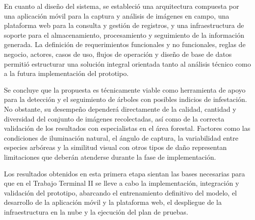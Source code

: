 En cuanto al diseño del sistema, se estableció una arquitectura compuesta por una aplicación móvil para la captura y análisis de imágenes en campo, una plataforma web para la consulta y gestión de registros, y una infraestructura de soporte para el almacenamiento, procesamiento y seguimiento de la información generada. La definición de requerimientos funcionales y no funcionales, reglas de negocio, actores, casos de uso, flujos de operación y diseño de base de datos permitió estructurar una solución integral orientada tanto al análisis técnico como a la futura implementación del prototipo.

Se concluye que la propuesta es técnicamente viable como herramienta de apoyo para la detección y el seguimiento de árboles con posibles indicios de infestación. No obstante, su desempeño dependerá directamente de la calidad, cantidad y diversidad del conjunto de imágenes recolectadas, así como de la correcta validación de los resultados con especialistas en el área forestal. Factores como las condiciones de iluminación natural, el ángulo de captura, la variabilidad entre especies arbóreas y la similitud visual con otros tipos de daño representan limitaciones que deberán atenderse durante la fase de implementación.

Los resultados obtenidos en esta primera etapa sientan las bases necesarias para que en el Trabajo Terminal II se lleve a cabo la implementación, integración y validación del prototipo, abarcando el entrenamiento definitivo del modelo, el desarrollo de la aplicación móvil y la plataforma web, el despliegue de la infraestructura en la nube y la ejecución del plan de pruebas.